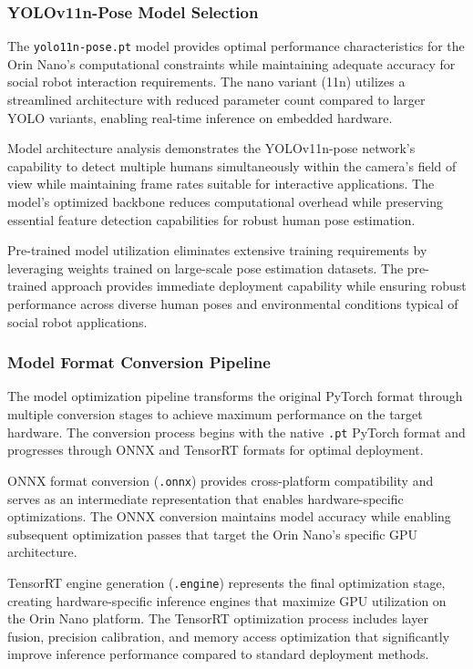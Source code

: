 \subsubsection{YOLOv11n-Pose Model Selection}

The \texttt{yolo11n-pose.pt} model provides optimal performance characteristics for the Orin Nano's computational constraints while maintaining adequate accuracy for social robot interaction requirements. The nano variant (11n) utilizes a streamlined architecture with reduced parameter count compared to larger YOLO variants, enabling real-time inference on embedded hardware.

Model architecture analysis demonstrates the YOLOv11n-pose network's capability to detect multiple humans simultaneously within the camera's field of view while maintaining frame rates suitable for interactive applications. The model's optimized backbone reduces computational overhead while preserving essential feature detection capabilities for robust human pose estimation.

Pre-trained model utilization eliminates extensive training requirements by leveraging weights trained on large-scale pose estimation datasets. The pre-trained approach provides immediate deployment capability while ensuring robust performance across diverse human poses and environmental conditions typical of social robot applications.

\subsubsection{Model Format Conversion Pipeline}

The model optimization pipeline transforms the original PyTorch format through multiple conversion stages to achieve maximum performance on the target hardware. The conversion process begins with the native \texttt{.pt} PyTorch format and progresses through ONNX and TensorRT formats for optimal deployment.

ONNX format conversion (\texttt{.onnx}) provides cross-platform compatibility and serves as an intermediate representation that enables hardware-specific optimizations. The ONNX conversion maintains model accuracy while enabling subsequent optimization passes that target the Orin Nano's specific GPU architecture.

TensorRT engine generation (\texttt{.engine}) represents the final optimization stage, creating hardware-specific inference engines that maximize GPU utilization on the Orin Nano platform. The TensorRT optimization process includes layer fusion, precision calibration, and memory access optimization that significantly improve inference performance compared to standard deployment methods.

